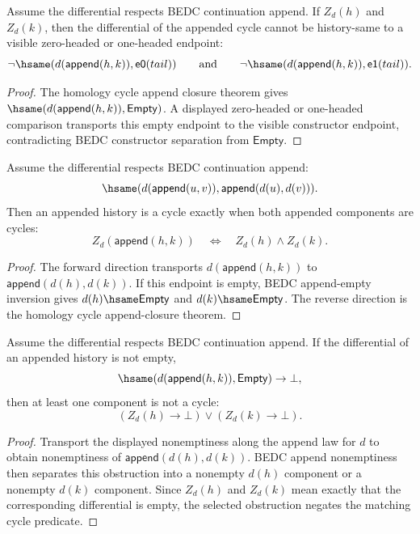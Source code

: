 \begin{theorem}
\label{thm:homology-cycle-carrier-append-visible-differential-absurd}
Assume the differential respects BEDC continuation append. If $Z_d(h)$ and
$Z_d(k)$, then the differential of the appended cycle cannot be history-same
to a visible zero-headed or one-headed endpoint:
$$
\neg\hsame(d(\mathsf{append}(h,k)),\mathsf{e0}(tail))
\qquad\text{and}\qquad
\neg\hsame(d(\mathsf{append}(h,k)),\mathsf{e1}(tail)).
$$
\end{theorem}
\begin{proof}
The homology cycle append closure theorem gives
$\hsame(d(\mathsf{append}(h,k)),\mathsf{Empty})$. A displayed zero-headed or
one-headed comparison transports this empty endpoint to the visible
constructor endpoint, contradicting BEDC constructor separation from
$\mathsf{Empty}$.
\end{proof}

\begin{theorem}
\label{thm:homology-cycle-carrier-append-components}
Assume the differential respects BEDC continuation append:
$$
\hsame(d(\mathsf{append}(u,v)),\mathsf{append}(d(u),d(v))).
$$
Then an appended history is a cycle exactly when both appended components are
cycles:
$$
Z_d(\mathsf{append}(h,k))
\quad\Longleftrightarrow\quad
Z_d(h)\wedge Z_d(k).
$$
\end{theorem}
\begin{proof}
The forward direction transports $d(\mathsf{append}(h,k))$ to
$\mathsf{append}(d(h),d(k))$. If this endpoint is empty, BEDC append-empty
inversion gives $d(h)\hsame\mathsf{Empty}$ and
$d(k)\hsame\mathsf{Empty}$. The reverse direction is the homology cycle
append-closure theorem.
\end{proof}

\begin{theorem}
\label{thm:homology-cycle-carrier-append-differential-nonempty-component-split}
Assume the differential respects BEDC continuation append. If the differential
of an appended history is not empty,
$$
\hsame(d(\mathsf{append}(h,k)),\mathsf{Empty})\to\bot,
$$
then at least one component is not a cycle:
$$
(Z_d(h)\to\bot)\vee(Z_d(k)\to\bot).
$$
\end{theorem}
\begin{proof}
Transport the displayed nonemptiness along the append law for $d$ to obtain
nonemptiness of $\mathsf{append}(d(h),d(k))$. BEDC append nonemptiness then
separates this obstruction into a nonempty $d(h)$ component or a nonempty
$d(k)$ component. Since $Z_d(h)$ and $Z_d(k)$ mean exactly that the
corresponding differential is empty, the selected obstruction negates the
matching cycle predicate.
\end{proof}


